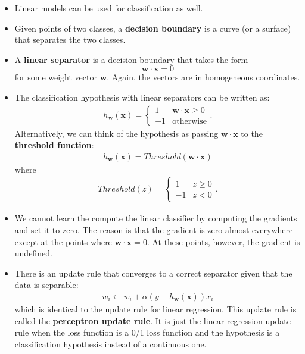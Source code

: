 \documentclass[10pt]{article}
\begin{document}
\begin{itemize}
    \item Linear models can be used for classification as well.
    
    \item Given points of two classes, a {\bf decision boundary}
        is a curve (or a surface) that separates the two classes.
        
    \item A {\bf linear separator} is a decision boundary
        that takes the form
        $$\mathbf{w} \cdot \mathbf{x} = 0$$
        for some weight vector $\mathbf{w}$. Again,
        the vectors are in homogeneous coordinates.
        
    \item The classification hypothesis with linear separators
        can be written as:
        \begin{align*}
            h_\mathbf{w}(\mathbf{x}) = \begin{cases}
                1 & \mathbf{w}\cdot \mathbf{x} \geq 0\\
                -1 & \mbox{otherwise}
            \end{cases}.
        \end{align*}
        Alternatively, we can think of the hypothesis as
        passing $\mathbf{w} \cdot \mathbf{x}$ to the
        {\bf threshold function}:
        \begin{align*}
            h_{\mathbf{w}}(\mathbf{x}) = Threshold(\mathbf{w}\cdot\mathbf{x})
        \end{align*}
        where
        \begin{align*}
            Threshold(z) = \begin{cases}
                1 & z \geq 0\\
                -1 & z < 0
            \end{cases}.
        \end{align*}
        
    \item We cannot learn the compute the linear classifier
        by computing the gradients and set it to zero.
        The reason is that the gradient is zero almost everywhere
        except at the points where 
        $\mathbf{w} \cdot \mathbf{x} = 0$.
        At these points, however, the gradient is undefined.
        
    \item There is an update rule that converges to a
        correct separator given that the data is separable:
        \begin{align*}
            w_i \gets w_i + 
            \alpha (y-h_\mathbf{w}(\mathbf{x}))x_i
        \end{align*}
        which is identical to the update rule for linear
        regression. This update rule is called the
        {\bf perceptron update rule}. It is just the
        linear regression update rule when the loss function
        is a 0/1 loss function and the hypothesis is a
        classification hypothesis instead of a continuous one.
        

\end{itemize}
\end{document}
